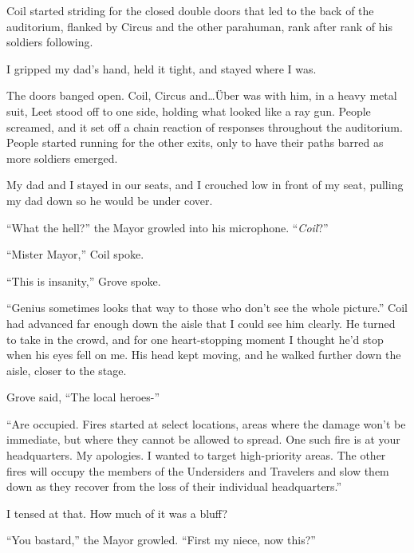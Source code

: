Coil started striding for the closed double doors that led to the back of the auditorium, flanked by Circus and the other parahuman, rank after rank of his soldiers following.



I gripped my dad's hand, held it tight, and stayed where I was.



The doors banged open.  Coil, Circus and\ldots \"{U}ber was with him, in a heavy metal suit, Leet stood off to one side, holding what looked like a ray gun.  People screamed, and it set off a chain reaction of responses throughout the auditorium.  People started running for the other exits, only to have their paths barred as more soldiers emerged.



My dad and I stayed in our seats, and I crouched low in front of my seat, pulling my dad down so he would be under cover.



``What the hell?'' the Mayor growled into his microphone.  ``\emph{Coil}?''



``Mister Mayor,'' Coil spoke.



``This is insanity,'' Grove spoke.



``Genius sometimes looks that way to those who don't see the whole picture.''  Coil had advanced far enough down the aisle that I could see him clearly.  He turned to take in the crowd, and for one heart-stopping moment I thought he'd stop when his eyes fell on me.  His head kept moving, and he walked further down the aisle, closer to the stage.



Grove said, ``The local heroes-''



``Are occupied.  Fires started at select locations, areas where the damage won't be immediate, but where they cannot be allowed to spread.  One such fire is at your headquarters.  My apologies.  I wanted to target high-priority areas.  The other fires will occupy the members of the Undersiders and Travelers and slow them down as they recover from the loss of their individual headquarters.''



I tensed at that.  How much of it was a bluff?



``You bastard,'' the Mayor growled.  ``First my niece, now this?''



